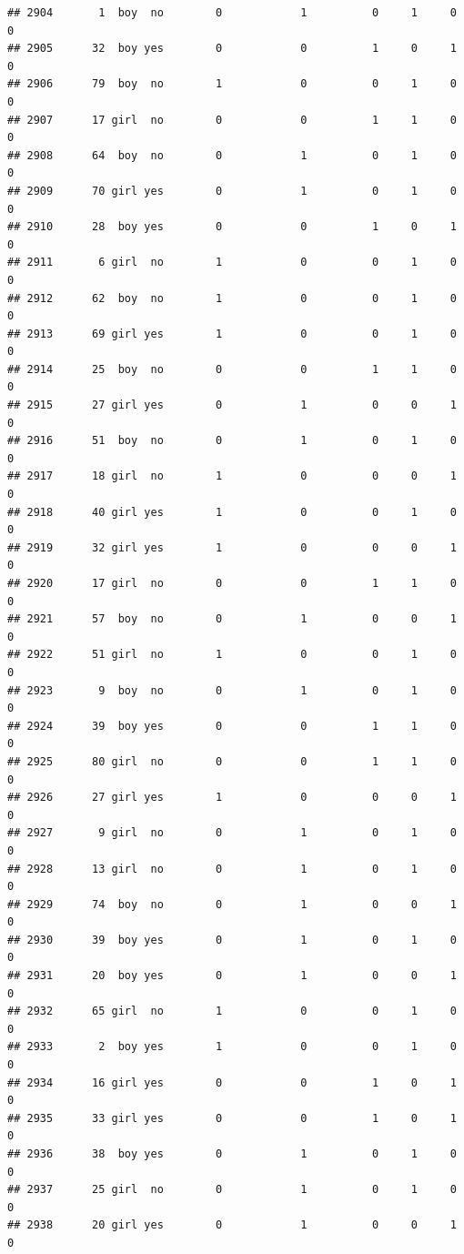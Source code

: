 \documentclass[man]{apa6}
\begin{document}
\begin{verbatim}
## 2904       1  boy  no        0            1          0     1     0     0
## 2905      32  boy yes        0            0          1     0     1     0
## 2906      79  boy  no        1            0          0     1     0     0
## 2907      17 girl  no        0            0          1     1     0     0
## 2908      64  boy  no        0            1          0     1     0     0
## 2909      70 girl yes        0            1          0     1     0     0
## 2910      28  boy yes        0            0          1     0     1     0
## 2911       6 girl  no        1            0          0     1     0     0
## 2912      62  boy  no        1            0          0     1     0     0
## 2913      69 girl yes        1            0          0     1     0     0
## 2914      25  boy  no        0            0          1     1     0     0
## 2915      27 girl yes        0            1          0     0     1     0
## 2916      51  boy  no        0            1          0     1     0     0
## 2917      18 girl  no        1            0          0     0     1     0
## 2918      40 girl yes        1            0          0     1     0     0
## 2919      32 girl yes        1            0          0     0     1     0
## 2920      17 girl  no        0            0          1     1     0     0
## 2921      57  boy  no        0            1          0     0     1     0
## 2922      51 girl  no        1            0          0     1     0     0
## 2923       9  boy  no        0            1          0     1     0     0
## 2924      39  boy yes        0            0          1     1     0     0
## 2925      80 girl  no        0            0          1     1     0     0
## 2926      27 girl yes        1            0          0     0     1     0
## 2927       9 girl  no        0            1          0     1     0     0
## 2928      13 girl  no        0            1          0     1     0     0
## 2929      74  boy  no        0            1          0     0     1     0
## 2930      39  boy yes        0            1          0     1     0     0
## 2931      20  boy yes        0            1          0     0     1     0
## 2932      65 girl  no        1            0          0     1     0     0
## 2933       2  boy yes        1            0          0     1     0     0
## 2934      16 girl yes        0            0          1     0     1     0
## 2935      33 girl yes        0            0          1     0     1     0
## 2936      38  boy yes        0            1          0     1     0     0
## 2937      25 girl  no        0            1          0     1     0     0
## 2938      20 girl yes        0            1          0     0     1     0

\end{verbatim}
\end{document}
